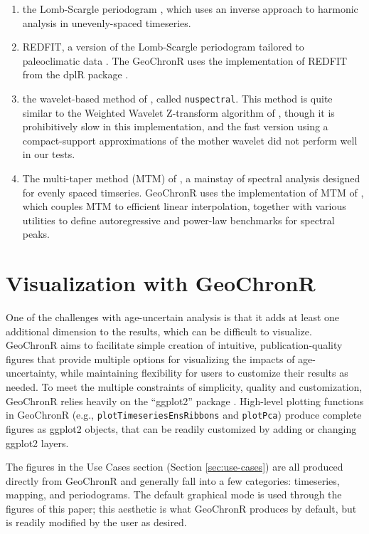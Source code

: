 \documentclass[gchron, manuscript]{copernicus}
\begin{document}
\begin{enumerate}
\def\labelenumi{\arabic{enumi}.}
\item
  the Lomb-Scargle periodogram \citep{VanderPlas_2018}, which uses an inverse approach to harmonic analysis in unevenly-spaced timeseries.
\item
  REDFIT, a version of the Lomb-Scargle periodogram tailored to paleoclimatic data \citep{SchulzMudelsee_02, Mudelsee_02, Mudelsee_NPG09}.
  The GeoChronR uses the implementation of REDFIT from the dplR package \citep{Bunn2008115}.
\item
  the wavelet-based method of \citet{Mathias_JSS04}, called \texttt{nuspectral}. This method is quite similar to the Weighted Wavelet Z-transform algorithm of \citet{Foster_AJ96}, though it is prohibitively slow in this implementation, and the fast version using a compact-support approximations of the mother wavelet did not perform well in our tests.
\item
  The multi-taper method (MTM) of \citet{thomson82}, a mainstay of spectral analysis \citep{Ghil02} designed for evenly spaced timseries.
  GeoChronR uses the implementation of MTM of \citet{astrochron}, which couples MTM to efficient linear interpolation, together with various utilities to define autoregressive and power-law benchmarks for spectral peaks.
\end{enumerate}

\hypertarget{sec:visualization}{%
\section{Visualization with GeoChronR}\label{sec:visualization}}

One of the challenges with age-uncertain analysis is that it adds at least one additional dimension to the results, which can be difficult to visualize.
GeoChronR aims to facilitate simple creation of intuitive, publication-quality figures that provide multiple options for visualizing the impacts of age-uncertainty, while maintaining flexibility for users to customize their results as needed.
To meet the multiple constraints of simplicity, quality and customization, GeoChronR relies heavily on the ``ggplot2'' package \citep{ggplot2}.
High-level plotting functions in GeoChronR (e.g., \texttt{plotTimeseriesEnsRibbons} and \texttt{plotPca}) produce complete figures as ggplot2 objects, that can be readily customized by adding or changing ggplot2 layers.

The figures in the Use Cases section (Section \ref{sec:use-cases}) are all produced directly from GeoChronR and generally fall into a few categories: timeseries, mapping, and periodograms.
The default graphical mode is used through the figures of this paper; this aesthetic is what GeoChronR produces by default, but is readily modified by the user as desired.
\end{document}
